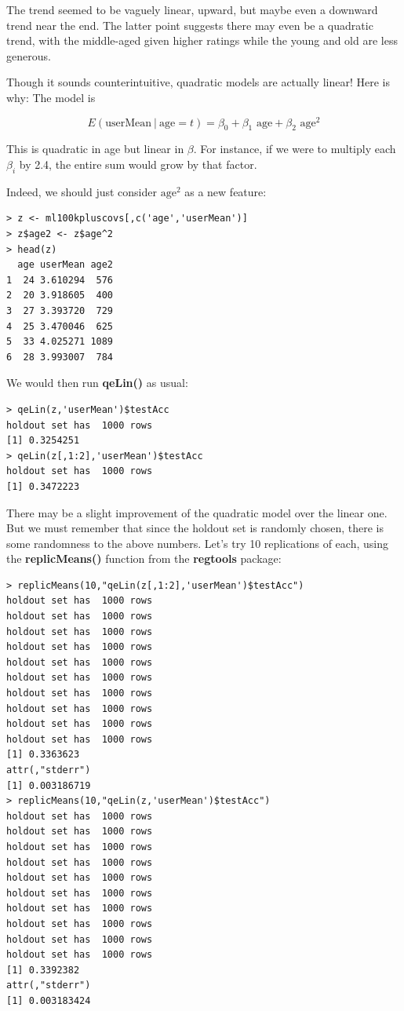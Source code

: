 The trend seemed to be vaguely linear, upward, but maybe even a downward
trend near the end.  The latter point suggests there may even be a
quadratic trend, with the middle-aged given higher ratings while the
young and old are less generous.

Though it sounds counterintuitive, quadratic models are actually linear!
Here is why:  The model is

\begin{equation}
\label{firstquad}
E( \textrm{userMean} ~|~ \textrm{age} = t) =
\beta_0 + \beta_1 \textrm{ age} + \beta_2 \textrm{ age}^2
\end{equation}

This is quadratic in age but linear in $\beta$.  For instance, if we
were to multiply each $\beta_i$ by 2.4, the entire sum would grow by
that factor.

Indeed, we should just consider $\textrm{age}^2$ as a new feature:

\begin{lstlisting}
> z <- ml100kpluscovs[,c('age','userMean')] 
> z$age2 <- z$age^2
> head(z)
  age userMean age2
1  24 3.610294  576
2  20 3.918605  400
3  27 3.393720  729
4  25 3.470046  625
5  33 4.025271 1089
6  28 3.993007  784
\end{lstlisting}

We would then run \textbf{qeLin()} as usual:

\begin{lstlisting}
> qeLin(z,'userMean')$testAcc
holdout set has  1000 rows
[1] 0.3254251
> qeLin(z[,1:2],'userMean')$testAcc
holdout set has  1000 rows
[1] 0.3472223
\end{lstlisting}

There may be a slight improvement of the quadratic model over the linear
one.  But we must remember that since the holdout set is randomly
chosen, there is some randomness to the above numbers.  Let's try 10
replications of each, using the \textbf{replicMeans()} function from the
\textbf{regtools} package:

\begin{lstlisting}
> replicMeans(10,"qeLin(z[,1:2],'userMean')$testAcc")
holdout set has  1000 rows
holdout set has  1000 rows
holdout set has  1000 rows
holdout set has  1000 rows
holdout set has  1000 rows
holdout set has  1000 rows
holdout set has  1000 rows
holdout set has  1000 rows
holdout set has  1000 rows
holdout set has  1000 rows
[1] 0.3363623
attr(,"stderr")
[1] 0.003186719
> replicMeans(10,"qeLin(z,'userMean')$testAcc")
holdout set has  1000 rows
holdout set has  1000 rows
holdout set has  1000 rows
holdout set has  1000 rows
holdout set has  1000 rows
holdout set has  1000 rows
holdout set has  1000 rows
holdout set has  1000 rows
holdout set has  1000 rows
holdout set has  1000 rows
[1] 0.3392382
attr(,"stderr")
[1] 0.003183424
\end{lstlisting}

